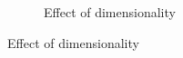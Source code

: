 \begin{figure}[ht]
  \begin{subfigure}{0.75\textwidth}
    \caption{Effect of dimensionality}
      \label{subfig:ctgan_fidelity_optimize_dimensions}
  \end{subfigure}
\end{figure}


